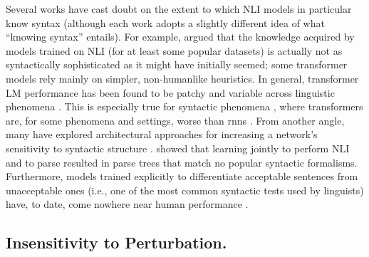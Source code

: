 \documentclass[letterpaper, 12pt]{report}
\begin{document}
Several works have cast doubt on the extent to which NLI models in particular know syntax (although each work adopts a slightly different idea of what ``knowing syntax'' entails). For example, \cite{mccoy-etal-2019-right} argued that the knowledge acquired by models trained on NLI (for at least some popular datasets) is actually not as syntactically sophisticated as it might have initially seemed; some transformer models rely mainly on simpler, non-humanlike heuristics. In general, transformer LM performance has been found to be patchy and variable across linguistic phenomena \citep{dasgupta-etal-2018-evaluating, naik-etal-2018-stress, an-etal-2019-representation, ravichander-etal-2019-equate, jeretic-etal-2020-natural}. This is especially true for syntactic phenomena \citep{marvin-linzen-2018-targeted, hu-etal-2020-systematic, gauthier-etal-2020-syntaxgym, mccoy-etal-2020-berts, warstadt-etal-2020-blimp}, where transformers are, for some phenomena and settings, worse than \acrshort{rnn}s \citep{van-schijndel-etal-2019-quantity}. From another angle, many have explored architectural approaches for increasing a network's sensitivity to syntactic structure \citep{chen-etal-2017-enhanced, Li-etal-2020-SANLI}. \cite{williams-etal-2018-latent} showed that learning jointly to perform NLI  and to parse resulted in parse trees that match no popular syntactic formalisms. Furthermore, models trained explicitly to differentiate acceptable sentences from unacceptable ones (i.e., one of the most common syntactic tests used by linguists) have, to date, come nowhere near human performance \citep{warstadt-etal-2019-neural}.

\subsection{Insensitivity to Perturbation.}
\end{document}
